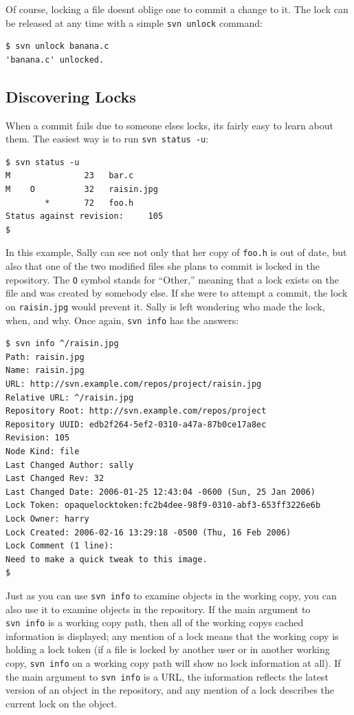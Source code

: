 Of course, locking a file doesn\textquotesingle t oblige one to commit a
change to it. The lock can be released at any time with a simple
\texttt{svn\ unlock} command:

\begin{verbatim}
$ svn unlock banana.c
'banana.c' unlocked.
\end{verbatim}

\subsection{Discovering Locks}\label{svn.advanced.locking.discovery}

When a commit fails due to someone else\textquotesingle s locks,
it\textquotesingle s fairly easy to learn about them. The easiest way is
to run \texttt{svn\ status\ -u}:

\begin{verbatim}
$ svn status -u
M               23   bar.c
M    O          32   raisin.jpg
        *       72   foo.h
Status against revision:     105
$
\end{verbatim}

In this example, Sally can see not only that her copy of \texttt{foo.h}
is out of date, but also that one of the two modified files she plans to
commit is locked in the repository. The \texttt{O} symbol stands for
``Other,'' meaning that a lock exists on the file and was created by
somebody else. If she were to attempt a commit, the lock on
\texttt{raisin.jpg} would prevent it. Sally is left wondering who made
the lock, when, and why. Once again, \texttt{svn\ info} has the answers:

\begin{verbatim}
$ svn info ^/raisin.jpg
Path: raisin.jpg
Name: raisin.jpg
URL: http://svn.example.com/repos/project/raisin.jpg
Relative URL: ^/raisin.jpg
Repository Root: http://svn.example.com/repos/project
Repository UUID: edb2f264-5ef2-0310-a47a-87b0ce17a8ec
Revision: 105
Node Kind: file
Last Changed Author: sally
Last Changed Rev: 32
Last Changed Date: 2006-01-25 12:43:04 -0600 (Sun, 25 Jan 2006)
Lock Token: opaquelocktoken:fc2b4dee-98f9-0310-abf3-653ff3226e6b
Lock Owner: harry
Lock Created: 2006-02-16 13:29:18 -0500 (Thu, 16 Feb 2006)
Lock Comment (1 line):
Need to make a quick tweak to this image.
$
\end{verbatim}

Just as you can use \texttt{svn\ info} to examine objects in the working
copy, you can also use it to examine objects in the repository. If the
main argument to \texttt{svn\ info} is a working copy path, then all of
the working copy\textquotesingle s cached information is displayed; any
mention of a lock means that the working copy is holding a lock token
(if a file is locked by another user or in another working copy,
\texttt{svn\ info} on a working copy path will show no lock information
at all). If the main argument to \texttt{svn\ info} is a URL, the
information reflects the latest version of an object in the repository,
and any mention of a lock describes the current lock on the object.

